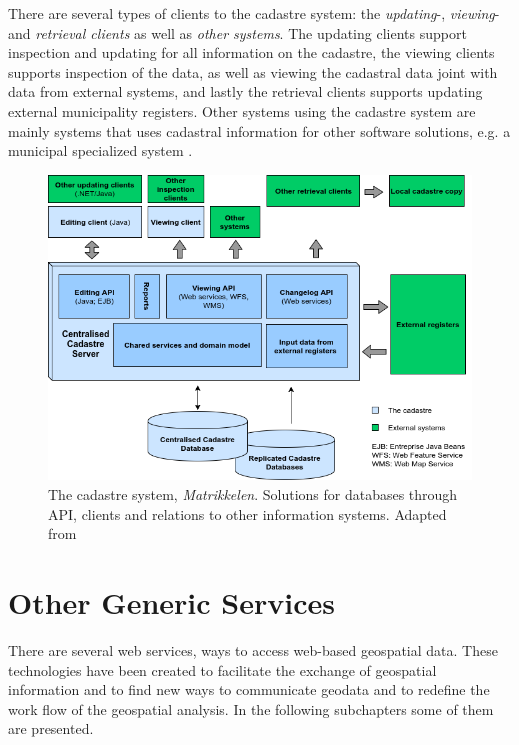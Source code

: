 There are several types of clients to the cadastre system: the \textit{updating}-, \textit{viewing}- and \textit{retrieval clients} as well as \textit{other systems}. The updating clients support inspection and updating for all information on the cadastre, the viewing clients supports inspection of the data, as well as viewing the cadastral data joint with data from external systems, and lastly the retrieval clients supports updating external municipality registers. Other systems using the cadastre system are mainly systems that uses cadastral information for other software solutions, e.g. a municipal specialized system \citep[p.~337-338]{Matrikkelavdelingen2017}.
 

\begin{figure}[H]
	\centering
	\includegraphics[scale=0.5]{img/matrikkelSYS}
	\caption{The cadastre system, \textit{Matrikkelen}. Solutions for databases through API, clients and relations to other information systems. Adapted from \citep[p.~337]{Matrikkelavdelingen2017} }
	\label{fig:matr}
\end{figure}

\section{Other Generic Services}
There are several web services, ways to access web-based geospatial data. These technologies have been created to facilitate the exchange of geospatial information and to find new ways to communicate geodata and to redefine the work flow of the geospatial analysis. In the following subchapters some of them are presented.  


